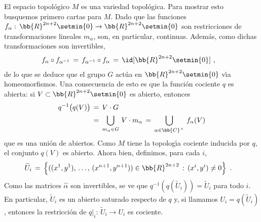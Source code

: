 \begin{ejemplo}
	El espacio topol\'{o}gico $M$ es una variedad topol\'{o}gica. Para
	mostrar esto busquemos primero cartas para $M$. Dado que las
	funciones $f_{\alpha}:\,\bb{R}^{2n+2}\setmin\{0\}%
		\rightarrow\bb{R}^{2n+2}\setmin\{0\}$ son restricciones de
	transformaciones lineales $m_{\alpha}$, son, en particular,
	continuas. Adem\'{a}s, como dichas transformaciones son invertibles,
	\begin{align*}
		f_{\alpha}\circ f_{\alpha^{-1}} & \,=\,
			f_{\alpha^{-1}}\circ f_{\alpha} \,=\,
			\id[\bb{R}^{2n+2}\setmin\{0\}]
		\text{ ,}
	\end{align*}
	de lo que se deduce que el grupo $G$ act\'{u}a en
	$\bb{R}^{2n+2}\setmin\{0\}$ v\'{\i}a homeomorfismos. Una consecuencia
	de esto es que la funci\'{o}n cociente $q$ es abierta: si
	$V\subset\bb{R}^{2n+2}\setmin\{0\}$ es abierto, entonces
	\begin{align*}
		q^{-1}\big(q(V)\big) & \,=\,V\cdot G \\
		& \,=\,\bigcup_{m_{\alpha}\in G}\,V\cdot m_{\alpha}
			\,=\,\bigcup_{\alpha\in\bb{C}^{\times}}\,
				f_{\alpha}(V)
	\end{align*}
	que es una uni\'{o}n de abiertos. Como $M$ tiene la topolog\'{\i}a
	cociente inducida por $q$, el conjunto $q(V)$ es abierto.
	Ahora bien, definimos, para cada $i$,
	\begin{align*}
		\widetilde{U}_{i} & \,=\,
			\left\lbrace((x^{1},y^{1}),\,\dots,\,
			(x^{n+1},y^{n+1}))\in\bb{R}^{2n+2}\,:\,
			(x^{i},y^{i})\not = 0\right\rbrace
		\text{ .}
	\end{align*}
	Como las matrices $\widehat{\alpha}$ son invertibles, se ve que
	$q^{-1}(q(\widetilde{U}_{i}))=\widetilde{U}_{i}$ para todo $i$. En
	particular, $\widetilde{U}_{i}$ es un abierto saturado respecto de
	$q$ y, si llamamos $U_{i}=q(\widetilde{U}_{i})$, entonces la
	restricci\'{o}n de $q|_{i}:\,\widetilde{U}_{i}\rightarrow U_{i}$ es
	cociente.


\end{ejemplo}
